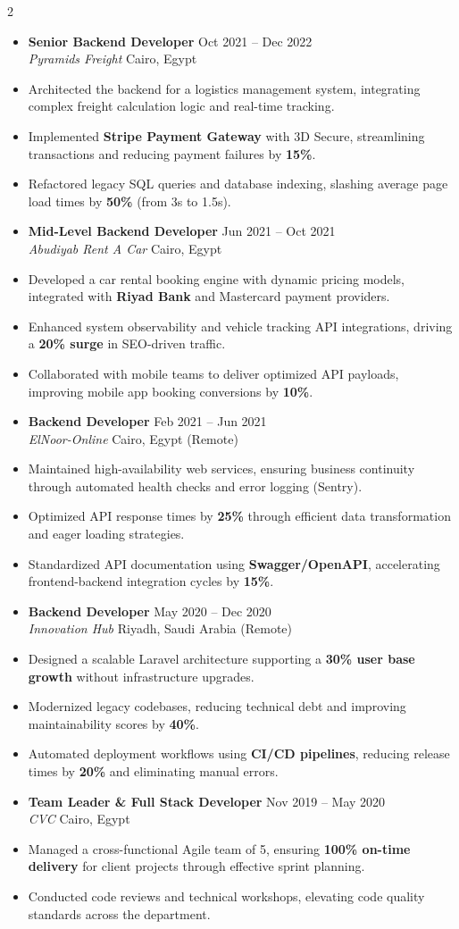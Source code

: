 \documentclass[10pt, a4paper]{article}
\newcommand{\resumeItem}[1]{
  \item\small{
    {#1 \vspace{3pt}} %
  }
}
\newcommand{\resumeSubheading}[4]{
  \vspace{10pt} %
  \item
    \textbf{#1} \hfill {\footnotesize #2} \\ 
    \textit{\small #3} \hfill {\footnotesize #4} \\
    \vspace{4pt}
}
\begin{document}
\begin{paracol}{2}
\begin{itemize}[leftmargin=0.15in, label={}]
    \resumeSubheading
      {Senior Backend Developer}{Oct 2021 -- Dec 2022}
      {Pyramids Freight}{Cairo, Egypt}
      \resumeItem{Architected the backend for a logistics management system, integrating complex freight calculation logic and real-time tracking.}
      \resumeItem{Implemented \textbf{Stripe Payment Gateway} with 3D Secure, streamlining transactions and reducing payment failures by \textbf{15\%}.}
      \resumeItem{Refactored legacy SQL queries and database indexing, slashing average page load times by \textbf{50\%} (from 3s to 1.5s).}

    \resumeSubheading
      {Mid-Level Backend Developer}{Jun 2021 -- Oct 2021}
      {Abudiyab Rent A Car}{Cairo, Egypt}
      \resumeItem{Developed a car rental booking engine with dynamic pricing models, integrated with \textbf{Riyad Bank} and Mastercard payment providers.}
      \resumeItem{Enhanced system observability and vehicle tracking API integrations, driving a \textbf{20\% surge} in SEO-driven traffic.}
      \resumeItem{Collaborated with mobile teams to deliver optimized API payloads, improving mobile app booking conversions by \textbf{10\%}.}

    \resumeSubheading
      {Backend Developer}{Feb 2021 -- Jun 2021}
      {ElNoor-Online}{Cairo, Egypt (Remote)}
      \resumeItem{Maintained high-availability web services, ensuring business continuity through automated health checks and error logging (Sentry).}
      \resumeItem{Optimized API response times by \textbf{25\%} through efficient data transformation and eager loading strategies.}
      \resumeItem{Standardized API documentation using \textbf{Swagger/OpenAPI}, accelerating frontend-backend integration cycles by \textbf{15\%}.}

    \resumeSubheading
      {Backend Developer}{May 2020 -- Dec 2020}
      {Innovation Hub}{Riyadh, Saudi Arabia (Remote)}
      \resumeItem{Designed a scalable Laravel architecture supporting a \textbf{30\% user base growth} without infrastructure upgrades.}
      \resumeItem{Modernized legacy codebases, reducing technical debt and improving maintainability scores by \textbf{40\%}.}
      \resumeItem{Automated deployment workflows using \textbf{CI/CD pipelines}, reducing release times by \textbf{20\%} and eliminating manual errors.}

    \resumeSubheading
      {Team Leader \& Full Stack Developer}{Nov 2019 -- May 2020}
      {CVC}{Cairo, Egypt}
      \resumeItem{Managed a cross-functional Agile team of 5, ensuring \textbf{100\% on-time delivery} for client projects through effective sprint planning.}
      \resumeItem{Conducted code reviews and technical workshops, elevating code quality standards across the department.}


\end{itemize}
\end{paracol}
\end{document}
